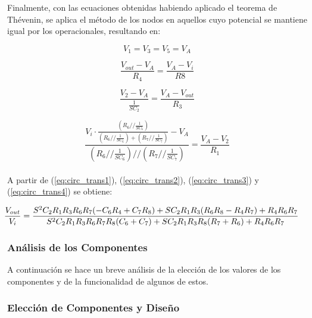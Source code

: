 Finalmente, con las ecuaciones obtenidas habiendo aplicado el teorema de Thévenin, se aplica el método de los nodos en aquellos cuyo potencial se mantiene igual por los operacionales, resultando en:

\begin{equation}
V_1=V_3=V_5=V_A
\label{eq:circ_trans1}
\end{equation}

\begin{equation}
\frac{V_{out} - V_A}{R_4} = \frac{V_A-V_i}{R8}
\label{eq:circ_trans2}
\end{equation}

\begin{equation}
\frac{V_2 - V_A}{\frac{1}{SC_2}} = \frac{V_A-V_{out}}{R_3}
\label{eq:circ_trans3}
\end{equation}

\begin{equation}
\frac{V_i \cdot \frac{\left(R_6 // \frac{1}{SC_6}\right)}{\left(R_6 // \frac{1}{SC_6}\right) + \left(R_7 // \frac{1}{SC_7}\right)} - V_A}{\left(R_6 // \frac{1}{SC_6}\right) // \left(R_7 // \frac{1}{SC_7}\right)} = \frac{V_A-V_2}{R_1}
\label{eq:circ_trans4}
\end{equation} \\

A partir de (\ref{eq:circ_trans1}), (\ref{eq:circ_trans2}), (\ref{eq:circ_trans3}) y (\ref{eq:circ_trans4}) se obtiene:

\begin{equation}
\hspace{-0.5cm}
\frac{V_{out}}{V_i} = \frac{S^2 C_2 R_1 R_3 R_6 R_7 (-C_6 R_4 + C_7 R_8) + S C_2 R_1 R_3 (R_6 R_8 - R_4 R_7) + R_4 R_6 R_7}{S^2 C_2 R_1 R_3 R_6 R_7 R_8 (C_6 + C_7)+S C_2 R_1 R_3 R_8 (R_7 + R_6) + R_4 R_6 R_7}
\label{circ_trans}
\end{equation}

\subsubsection{Análisis de los Componentes}
	
A continuación se hace un breve análisis de la elección de los valores de los componentes y de la funcionalidad de algunos de estos.

\subsubsection{Elección de Componentes y Diseño}
\label{sec:eleccion_componentes}

